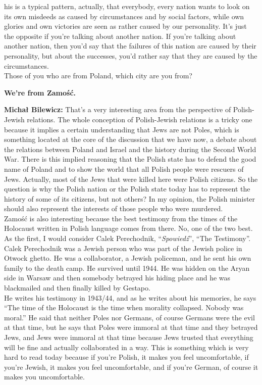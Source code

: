  his is a typical pattern, actually, that everybody, every nation wants to look on its own misdeeds as caused by circumstances and by social factors, while own glories and own victories are seen as rather caused by our personality. It's just the opposite if you're talking about another nation. If you're talking about another nation, then you'd say that the failures of this nation are caused by their personality, but about the successes, you'd rather say that they are caused by the circumstances.\\
Those of you who are from Poland, which city are you from? 

\textbf{We're from Zamość.}

\textbf{Michał Bilewicz:} That's a very interesting area from the perspective of Polish-Jewish relations. The whole conception of Polish-Jewish relations is a tricky one because it implies a certain understanding that Jews are not Poles, which is something located at the core of the discussion that we have now, a debate about the relations between Poland and Israel and the history during the Second World War. There is this implied reasoning that the Polish state has to defend the good name of Poland and to show the world that all Polish people were rescuers of Jews. Actually, most of the Jews that were killed here were Polish citizens. So the question is why the Polish nation or the Polish state today has to represent the history of some of its citizens, but not others? In my opinion, the Polish minister should also represent the interests of those people who were murdered.\\
Zamość is also interesting because the best testimony from the times of the Holocaust written in Polish language comes from there. No, one of the two best. As the first, I would consider Calek Perechodnik, ``\textit{Spowiedź}'', ``The Testimony''. Calek Perechodnik was a Jewish person who was part of the Jewish police in Otwock ghetto. He was a collaborator, a Jewish policeman, and he sent his own family to the death camp. He survived until 1944. He was hidden on the Aryan side in Warsaw and then somebody betrayed his hiding place and he was blackmailed and then finally killed by Gestapo.\\
He writes his testimony in 1943/44, and as he writes about his memories, he says ``The time of the Holocaust is the time when morality collapsed. Nobody was moral.'' He said that neither Poles nor Germans, of course Germans were the evil at that time, but he says that Poles were immoral at that time and they betrayed Jews, and Jews were immoral at that time because Jews trusted that everything will be fine and actually collaborated in a way. This is something which is very hard to read today because if you're Polish, it makes you feel uncomfortable, if you're Jewish, it makes you feel uncomfortable, and if you're German, of course it makes you uncomfortable.\\
